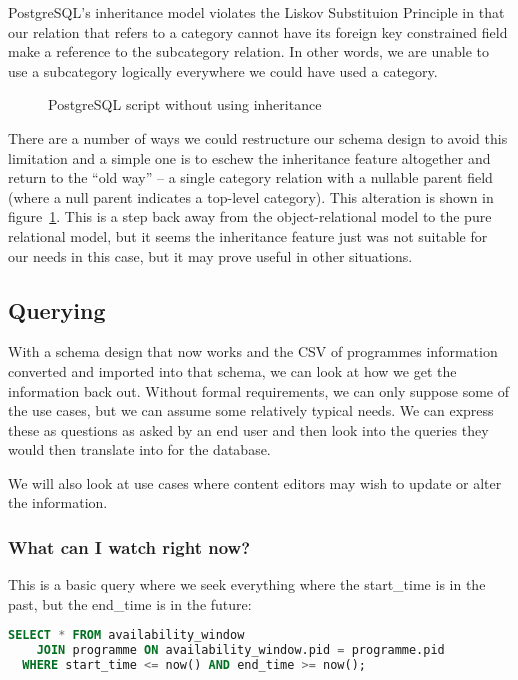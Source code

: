 \documentclass[11pt,a4paper]{article}
\begin{document}
PostgreSQL's inheritance model violates the Liskov Substituion Principle
in that our relation that refers to a category cannot have its foreign key
constrained field make a reference to the subcategory relation. In other
words, we are unable to use a subcategory logically everywhere we could
have used a category.

\begin{figure}[p]
  
  \caption{PostgreSQL script without using inheritance}
  \label{fig:flatten-category}
\end{figure}

There are a number of ways we could restructure our schema design to
avoid this limitation and a simple one is to eschew the inheritance feature
altogether and return to the ``old way'' -- a single category relation
with a nullable parent field (where a null parent indicates a top-level
category). This alteration is shown in figure~\ref{fig:flatten-category}.
This is a step back away from the object-relational model to the pure
relational model, but it seems the inheritance feature just was not
suitable for our needs in this case, but it may prove useful in other
situations.

\subsection{Querying}

With a schema design that now works and the CSV of programmes information
converted and imported into that schema, we can look at how we get
the information back out. Without formal requirements, we can only
suppose some of the use cases, but we can assume some relatively typical
needs. We can express these as questions as asked by an end user and then
look into the queries they would then translate into for the database.

We will also look at use cases where content editors may wish to update
or alter the information.

\subsubsection{What can I watch right now?}

This is a basic query where we seek everything where the start\_time is
in the past, but the end\_time is in the future:

\begin{lstlisting}[language=SQL]
  SELECT * FROM availability_window
    JOIN programme ON availability_window.pid = programme.pid
  WHERE start_time <= now() AND end_time >= now();
\end{lstlisting}
\end{document}
